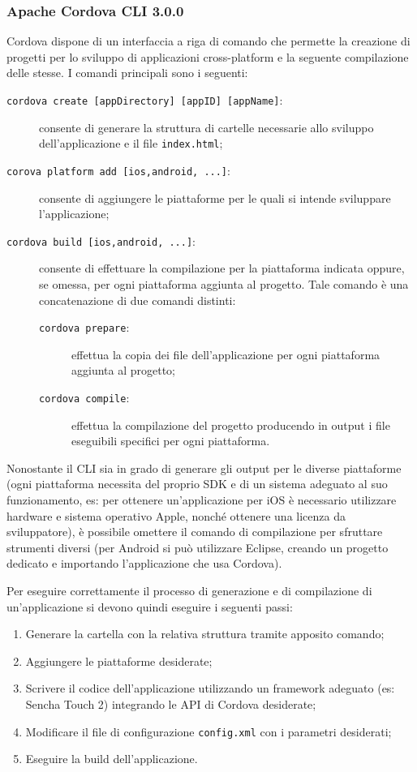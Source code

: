 \label{sec:cordova}
\subsubsection{Apache Cordova CLI 3.0.0}
Cordova dispone di un interfaccia a riga di comando che permette la creazione di progetti per lo sviluppo di applicazioni cross-platform e la seguente compilazione delle stesse.
I comandi principali sono i seguenti:
\begin{description}
\item[\texttt{cordova create [appDirectory] [appID] [appName]}:] consente di generare la struttura di cartelle necessarie allo sviluppo dell'applicazione e il file \texttt{index.html};
\item[\texttt{corova platform add [ios,android, ...]}:] consente di aggiungere le piattaforme per le quali si intende sviluppare l'applicazione;
\item[\texttt{cordova build [ios,android, ...]}:] consente di effettuare la compilazione per la piattaforma indicata oppure, se omessa, per ogni piattaforma aggiunta al progetto. Tale comando è una concatenazione di due comandi distinti:
	\begin{description}
	\item[\texttt{cordova prepare}:] effettua la copia dei file dell'applicazione per ogni piattaforma aggiunta al progetto;
	\item[\texttt{cordova compile}:] effettua la compilazione del progetto producendo in output i file eseguibili specifici per ogni piattaforma.
	\end{description}
\end{description}

Nonostante il CLI sia in grado di generare gli output per le diverse piattaforme (ogni piattaforma necessita del proprio SDK e di un sistema adeguato al suo funzionamento, es: per ottenere un'applicazione per iOS è necessario utilizzare hardware e sistema operativo Apple, nonché ottenere una licenza da sviluppatore), è possibile omettere il comando di compilazione per sfruttare strumenti diversi (per Android si può utilizzare Eclipse, creando un progetto dedicato e importando l'applicazione che usa Cordova).

Per eseguire correttamente il processo di generazione e di compilazione di un'applicazione si devono quindi eseguire i seguenti passi:
\begin{enumerate}
\item Generare la cartella con la relativa struttura tramite apposito comando;
\item Aggiungere le piattaforme desiderate;
\item Scrivere il codice dell'applicazione utilizzando un framework adeguato (es: Sencha Touch 2) integrando le API di Cordova desiderate;
\item Modificare il file di configurazione \texttt{config.xml} con i parametri desiderati;
\item Eseguire la build dell'applicazione.
\end{enumerate}

